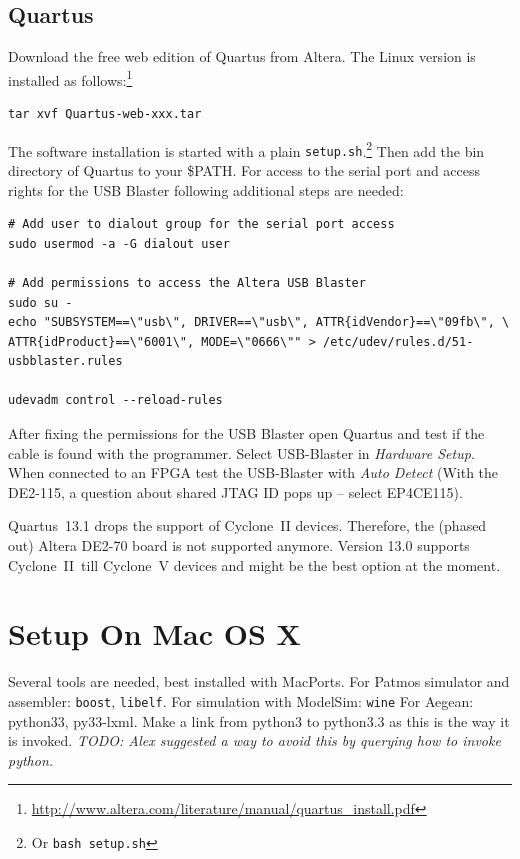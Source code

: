 \documentclass[a4paper,fontsize=10pt,twoside,DIV15,BCOR12mm,headinclude=true,footinclude=false,pagesize,bibtotoc]{scrbook}
\newcommand{\code}[1]{{\texttt{#1}}}
\newcommand{\todo}[1]{{\emph{TODO: #1}}}
\begin{document}
\subsection{Quartus}

Download the free web edition of Quartus from Altera. The Linux version is
installed as follows:\footnote{\url{http://www.altera.com/literature/manual/quartus_install.pdf}}

\begin{verbatim}
tar xvf Quartus-web-xxx.tar
\end{verbatim}

The software installation is started with a plain \code{setup.sh}.\footnote{Or \code{bash setup.sh}}
Then add the bin directory of Quartus to your \$PATH.
%
For access to the serial port and access rights for the USB Blaster following additional steps are needed:

\begin{verbatim}
# Add user to dialout group for the serial port access
sudo usermod -a -G dialout user

# Add permissions to access the Altera USB Blaster
sudo su -
echo "SUBSYSTEM==\"usb\", DRIVER==\"usb\", ATTR{idVendor}==\"09fb\", \
ATTR{idProduct}==\"6001\", MODE=\"0666\"" > /etc/udev/rules.d/51-usbblaster.rules

udevadm control --reload-rules
\end{verbatim}

After fixing the permissions for the USB Blaster open Quartus and test if the
cable is found with the programmer. Select USB-Blaster in \emph{Hardware Setup}.
When connected to an FPGA test the USB-Blaster with \emph{Auto Detect}
(With the DE2-115, a question about shared JTAG ID pops up -- select EP4CE115).

Quartus~13.1 drops the support of Cyclone~II devices. Therefore, the
(phased out) Altera DE2-70 board is not supported anymore. Version 13.0 supports Cyclone~II\
till Cyclone~V devices and might be the best option at the moment.

\section{Setup On Mac OS X}

Several tools are needed, best installed with MacPorts. For Patmos simulator and assembler:
\code{boost}, \code{libelf}.
For simulation with ModelSim: \code{wine}
For Aegean: python33, py33-lxml. Make a link from python3 to python3.3 as this is the way it is invoked.
\todo{Alex suggested a way to avoid this by querying how to invoke python.}
\end{document}
